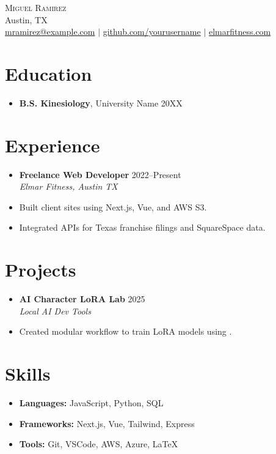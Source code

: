 \documentclass[letterpaper,10pt]{article}
\newcommand{\resumeItem}[1]{\item\small{#1}}
\newcommand{\resumeSubheading}[4]{
  \vspace{-1pt}\item
    \textbf{#1} \hfill #2 \\
    \textit{\small#3} \hfill \textit{\small #4}
}
\begin{document}
\begin{center}
  {\Huge \scshape Miguel Ramirez} \\ \vspace{1pt}
  Austin, TX \\ 
  \href{mailto:mramirez@example.com}{mramirez@example.com} $|$
  \href{https://github.com/yourusername}{github.com/yourusername} $|$
  \href{https://elmarfitness.com}{elmarfitness.com}
\end{center}

\section*{Education}
\begin{itemize}[leftmargin=0.15in]
  \item[]
    \textbf{B.S. Kinesiology}, University Name \hfill 20XX
\end{itemize}

\section*{Experience}
\begin{itemize}[leftmargin=0.15in]
  \resumeSubheading
    {Freelance Web Developer}{2022–Present}
    {Elmar Fitness, Austin TX}{}
    \resumeItem{Built client sites using Next.js, Vue, and AWS S3.}
    \resumeItem{Integrated APIs for Texas franchise filings and SquareSpace data.}
\end{itemize}

\section*{Projects}
\begin{itemize}[leftmargin=0.15in]
  \resumeSubheading
    {AI Character LoRA Lab}{2025}
    {Local AI Dev Tools}{}
    \resumeItem{Created modular workflow to train LoRA models using \texttt{\detokenize{kohya_ss}}.}
\end{itemize}

\section*{Skills}
\begin{itemize}[leftmargin=0.15in, label={}]
  \item \textbf{Languages:} JavaScript, Python, SQL
  \item \textbf{Frameworks:} Next.js, Vue, Tailwind, Express
  \item \textbf{Tools:} Git, VSCode, AWS, Azure, LaTeX
\end{itemize}
\end{document}
